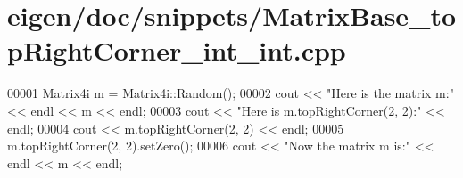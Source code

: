 \hypertarget{eigen_2doc_2snippets_2_matrix_base__top_right_corner__int__int_8cpp_source}{}\section{eigen/doc/snippets/\+Matrix\+Base\+\_\+top\+Right\+Corner\+\_\+int\+\_\+int.cpp}
\label{eigen_2doc_2snippets_2_matrix_base__top_right_corner__int__int_8cpp_source}

\begin{DoxyCode}
00001 Matrix4i m = Matrix4i::Random();
00002 cout << \textcolor{stringliteral}{"Here is the matrix m:"} << endl << m << endl;
00003 cout << \textcolor{stringliteral}{"Here is m.topRightCorner(2, 2):"} << endl;
00004 cout << m.topRightCorner(2, 2) << endl;
00005 m.topRightCorner(2, 2).setZero();
00006 cout << \textcolor{stringliteral}{"Now the matrix m is:"} << endl << m << endl;
\end{DoxyCode}
